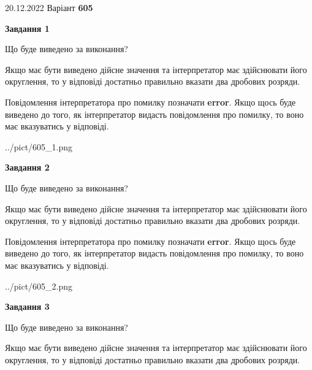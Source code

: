 \documentclass[12pt, ukrainian]{article}
\begin{document}
{20.12.2022 Варіант \No \textbf { 605 }\par}
{
\begin {Large}

{\begin {center}\textbf{Завдання 1}\end {center}}\par
Що буде виведено за виконання? \par

Якщо має бути виведено дійсне значення та інтерпретатор має здійснювати його округлення, 
то у відповіді достатньо правильно вказати два дробових розряди.

Повідомлення інтерпретатора про помилку позначати \textbf{error}.
Якщо щось буде виведено до того, як інтерпретатор видасть повідомлення про помилку, 
то воно має вказуватись у відповіді. \par

\begin{center}
	{../pict/605_1.png}
\end{center}
\newpage

{\begin {center}\textbf{Завдання 2}\end {center}}\par
Що буде виведено за виконання? \par

Якщо має бути виведено дійсне значення та інтерпретатор має здійснювати його округлення, 
то у відповіді достатньо правильно вказати два дробових розряди.

Повідомлення інтерпретатора про помилку позначати \textbf{error}.
Якщо щось буде виведено до того, як інтерпретатор видасть повідомлення про помилку, 
то воно має вказуватись у відповіді. \par

\begin{center}
	{../pict/605_2.png}
\end{center}
\newpage

{\begin {center}\textbf{Завдання 3}\end {center}}\par
Що буде виведено за виконання? \par

Якщо має бути виведено дійсне значення та інтерпретатор має здійснювати його округлення, 
то у відповіді достатньо правильно вказати два дробових розряди.


\end{Large}}
\end{document}
